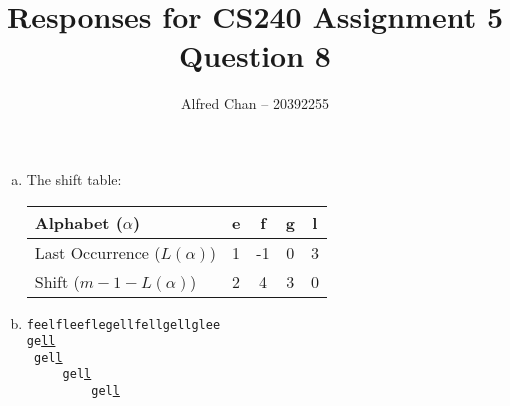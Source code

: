 \documentclass[12pt]{article}
\title{Responses for CS240 Assignment 5 Question 8}
\author{Alfred Chan -- 20392255}
\begin{document}
\maketitle

\begin{enumerate}[(a)]
\item
The shift table:\\
\begin{tabular}{|l|c|c|c|c|}
\hline
Alphabet ($\alpha$) & e & f & g & l\\\hline
Last Occurrence ($L(\alpha)$) & 1 & -1 & 0 & 3\\\hline
Shift ($m-1-L(\alpha)$) & 2 & 4 & 3 & 0\\\hline
\end{tabular}
\item
\verb+feelfleeflegellfellgellglee+\\
\texttt{ge\underline{ll}}\\
\verb+ +\texttt{gel\underline{l}}\\
\verb+     +\texttt{gel\underline{l}}\\
\verb+         +\texttt{gel\underline{l}}\\
\end{enumerate}
\done
\end{document}

